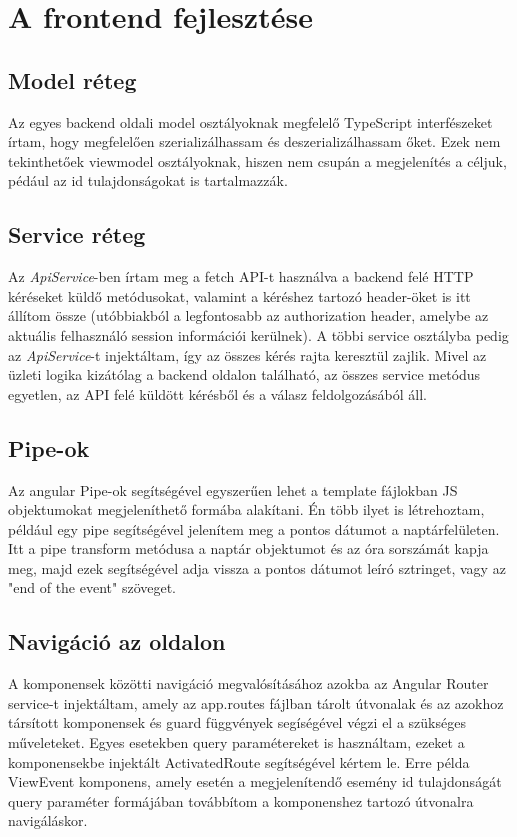 \documentclass[a4paper,12pt]{report}
\theoremstyle{definition}
\theoremstyle{remark}
\begin{document}
\chapter{A frontend fejlesztése}

\section{Model réteg}

Az egyes backend oldali model osztályoknak megfelelő TypeScript interfészeket írtam, hogy megfelelően szerializálhassam és deszerializálhassam őket. Ezek nem tekinthetőek viewmodel\cite{Viewmodelwebsite} osztályoknak, hiszen nem csupán a megjelenítés a céljuk, pédául az id tulajdonságokat is tartalmazzák.

\section{Service réteg}

Az \textit{ApiService}-ben írtam meg a fetch API-t\cite{Fetchwebsite} használva a backend felé HTTP kéréseket küldő metódusokat, valamint a kéréshez tartozó header-öket is itt állítom össze (utóbbiakból a legfontosabb az authorization header, amelybe az aktuális felhasználó session információi kerülnek). A többi service osztályba pedig az \textit{ApiService}-t injektáltam, így az összes kérés rajta keresztül zajlik.  Mivel az üzleti logika kizátólag a backend oldalon található, az összes service metódus egyetlen, az API felé küldött kérésből és a válasz feldolgozásából áll.

\section{Pipe-ok}

Az angular Pipe-ok\cite{Pipewebsite} segítségével egyszerűen lehet a template fájlokban JS objektumokat megjeleníthető formába alakítani. Én több ilyet is létrehoztam, például egy pipe segítségével jelenítem meg a pontos dátumot a naptárfelületen. Itt a pipe transform metódusa a naptár objektumot és az óra sorszámát kapja meg, majd ezek segítségével adja vissza a pontos dátumot leíró sztringet, vagy az "end of the event" szöveget.

\section{Navigáció az oldalon}

A komponensek közötti navigáció megvalósításához azokba az Angular Router service-t\cite{Routerwebsite} injektáltam, amely az app.routes fájlban tárolt útvonalak és az azokhoz társított komponensek és guard függvények segíségével végzi el a szükséges műveleteket. Egyes esetekben query paramétereket is használtam, ezeket a komponensekbe injektált ActivatedRoute segítségével kértem le. Erre példa ViewEvent komponens, amely esetén a megjelenítendő esemény id tulajdonságát query paraméter formájában továbbítom a komponenshez tartozó útvonalra navigáláskor.
\end{document}
